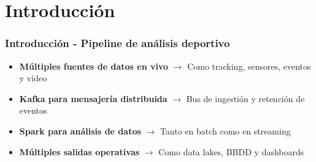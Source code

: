 \documentclass[aspectratio=169]{beamer}
\begin{document}
\section{Introducción}

\begin{frame}\frametitle{Introducción - Pipeline de análisis deportivo}
  \begin{itemize}
    \item \textbf{Múltiples fuentes de datos en vivo} $\rightarrow$ Como tracking, sensores, eventos y vídeo

    \vspace{1em}
      
    \item \textbf{Kafka para mensajería distribuida} $\rightarrow$ Bus de ingestión y retención de eventos

    \vspace{1em}

    \item \textbf{Spark para análisis de datos} $\rightarrow$ Tanto en batch como en streaming

    \vspace{1em}

    \item \textbf{Múltiples salidas operativas} $\rightarrow$ Como data lakes, BBDD y dashboards
  \end{itemize}
\end{frame}
\end{document}
